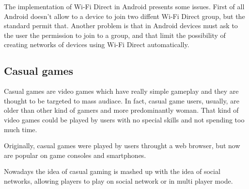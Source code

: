 The implementation of Wi-Fi Direct in Android presents some issues. First of all
Android doesn't allow to a device to join two diffent Wi-Fi Direct group, but 
the standard permit that. Another problem is that in Android devices must ask 
to the user the permission to join to a group, and that limit the possibility
of creating networks of devices using Wi-Fi Direct automatically.

\subsection{Casual games}
Casual games are video games which have really simple gameplay and they are
thought to be targeted to mass audiace. In fact, casual game users, usually, are
older than other kind of gamers and more predominantly woman. That kind of video
games could be played by users with no special skills and not spending too much 
time.

Originally, casual games were played by users throught a web browser, but now 
are popular on game consoles and smartphones.

Nowadays the idea of casual gaming is mashed up with the idea of social networks,
allowing players to play on social network or in multi player mode.